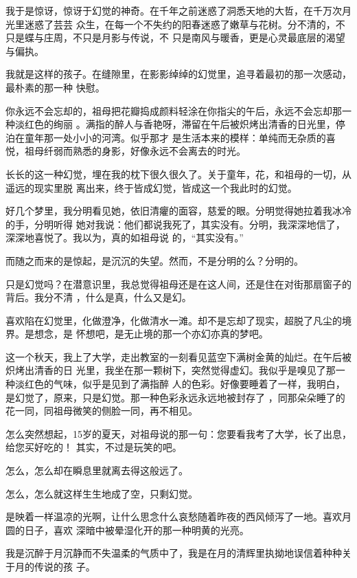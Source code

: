\documentclass[12pt,a4paper]{article}
\begin{document}
		我于是惊讶，惊讶于幻觉的神奇。在千年之前迷惑了洞悉天地的大哲，在千万次月光里迷惑了芸芸
	众生，在每一个不失约的阳春迷惑了嫩草与花树。分不清的，不只是蝶与庄周，不只是月影与传说，不
	只是南风与暖香，更是心灵最底层的渴望与偏执。

		我就是这样的孩子。在缝隙里，在影影绰绰的幻觉里，追寻着最初的那一次感动，最朴素的那一种
	快慰。

		你永远不会忘却的，祖母把花瓣捣成颜料轻涂在你指尖的午后，永远不会忘却那一种淡红色的绚丽
	。满指的醉人与香艳呀，滞留在午后被炽烤出清香的日光里，停泊在童年那一处小小的河湾。似乎那才
	是生活本来的模样：单纯而无杂质的喜悦，祖母纤弱而熟悉的身影，好像永远不会离去的时光。

		长长的这一种幻觉，埋在我的枕下很久很久了。关于童年，花，和祖母的一切，从遥远的现实里脱
	离出来，终于皆成幻觉，皆成这一个我此时的幻觉。

		好几个梦里，我分明看见她，依旧清癯的面容，慈爱的眼。分明觉得她拉着我冰冷的手，分明听得
	她对我说：他们都说我死了，其实没有。分明，我深深地信了，深深地喜悦了。我以为，真的如祖母说
	的，“其实没有。”

		而随之而来的是惊起，是沉沉的失望。然而，不是分明的么？分明的。

		只是幻觉吗？在潜意识里，我总觉得祖母还是在这人间，还是住在对街那扇窗子的背后。我分不清
	，什么是真，什么又是幻。

		喜欢陷在幻觉里，化做澄净，化做清水一滩。却不是忘却了现实，超脱了凡尘的境界。是想念，是
	怀想吧，是无止境的那一个亦幻亦真的梦吧。

		这一个秋天，我上了大学，走出教室的一刻看见蓝空下满树金黄的灿烂。在午后被炽烤出清香的日
	光里，我坐在那一颗树下，突然觉得虚幻。我似乎是嗅见了那一种淡红色的气味，似乎是见到了满指醉
	人的色彩。好像要睡着了一样，我明白，是幻觉了，原来，只是幻觉。那一种色彩永远永远地被封存了
	，同那朵朵睡了的花一同，同祖母微笑的侧脸一同，再不相见。

		怎么突然想起，15岁的夏天，对祖母说的那一句：您要看我考了大学，长了出息，给您买好吃的！
	其实，不过是玩笑的吧。

		怎么，怎么却在瞬息里就离去得这般远了。

		怎么，怎么就这样生生地成了空，只剩幻觉。

	\endwriting



		是映着一样温凉的光啊，让什么思念什么哀愁随着昨夜的西风倾泻了一地。喜欢月圆的日子，喜欢
	深暗中被晕湿化开的那一种明黄的光亮。

		我是沉醉于月沉静而不失温柔的气质中了，我是在月的清辉里执拗地误信着种种关于月的传说的孩
	子。
\end{document}
